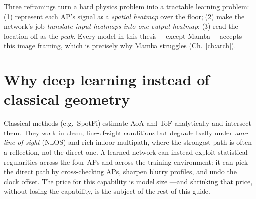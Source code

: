 \begin{keyidea}
Three reframings turn a hard physics problem into a tractable learning problem: (1) represent each
AP's signal as a \emph{spatial heatmap} over the floor; (2) make the network's job \emph{translate
input heatmaps into one output heatmap}; (3) read the location off as the \emph{peak}. Every model in
this thesis ---except Mamba--- accepts this image framing, which is precisely why Mamba struggles
(Ch.~\ref{ch:arch}).
\end{keyidea}

\section{Why deep learning instead of classical geometry}
\label{sec:found:why_dl}

Classical methods (e.g.\ SpotFi) estimate AoA and ToF analytically and intersect them. They work in
clean, line-of-sight conditions but degrade badly under \emph{non-line-of-sight} (NLOS) and rich
indoor multipath, where the strongest path is often a reflection, not the direct one. A learned
network can instead exploit statistical regularities across the four APs and across the training
environment: it can pick the direct path by cross-checking APs, sharpen blurry profiles, and undo
the clock offset. The price for this capability is model size ---and shrinking that price, without
losing the capability, is the subject of the rest of this guide.
